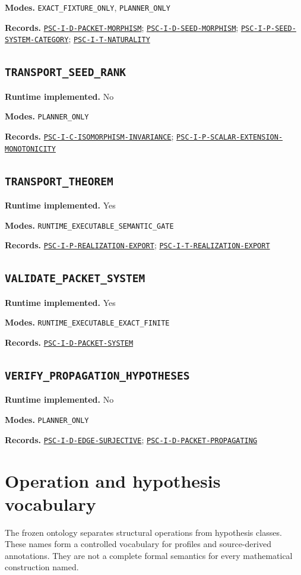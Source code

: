 \documentclass[a4paper,11pt]{article}
\newcommand{\field}[2]{\par\smallskip\noindent\textbf{#1.} #2\par}
\begin{document}
\field{Modes}{\nolinkurl{EXACT_FIXTURE_ONLY}, \nolinkurl{PLANNER_ONLY}}
\field{Records}{\hyperref[rec:PSC-I-D-PACKET-MORPHISM]{\nolinkurl{PSC-I-D-PACKET-MORPHISM}}; \hyperref[rec:PSC-I-D-SEED-MORPHISM]{\nolinkurl{PSC-I-D-SEED-MORPHISM}}; \hyperref[rec:PSC-I-P-SEED-SYSTEM-CATEGORY]{\nolinkurl{PSC-I-P-SEED-SYSTEM-CATEGORY}}; \hyperref[rec:PSC-I-T-NATURALITY]{\nolinkurl{PSC-I-T-NATURALITY}}}
\subsection*{\nolinkurl{TRANSPORT_SEED_RANK}}
\field{Runtime implemented}{No}
\field{Modes}{\nolinkurl{PLANNER_ONLY}}
\field{Records}{\hyperref[rec:PSC-I-C-ISOMORPHISM-INVARIANCE]{\nolinkurl{PSC-I-C-ISOMORPHISM-INVARIANCE}}; \hyperref[rec:PSC-I-P-SCALAR-EXTENSION-MONOTONICITY]{\nolinkurl{PSC-I-P-SCALAR-EXTENSION-MONOTONICITY}}}
\subsection*{\nolinkurl{TRANSPORT_THEOREM}}
\field{Runtime implemented}{Yes}
\field{Modes}{\nolinkurl{RUNTIME_EXECUTABLE_SEMANTIC_GATE}}
\field{Records}{\hyperref[rec:PSC-I-P-REALIZATION-EXPORT]{\nolinkurl{PSC-I-P-REALIZATION-EXPORT}}; \hyperref[rec:PSC-I-T-REALIZATION-EXPORT]{\nolinkurl{PSC-I-T-REALIZATION-EXPORT}}}
\subsection*{\nolinkurl{VALIDATE_PACKET_SYSTEM}}
\field{Runtime implemented}{Yes}
\field{Modes}{\nolinkurl{RUNTIME_EXECUTABLE_EXACT_FINITE}}
\field{Records}{\hyperref[rec:PSC-I-D-PACKET-SYSTEM]{\nolinkurl{PSC-I-D-PACKET-SYSTEM}}}
\subsection*{\nolinkurl{VERIFY_PROPAGATION_HYPOTHESES}}
\field{Runtime implemented}{No}
\field{Modes}{\nolinkurl{PLANNER_ONLY}}
\field{Records}{\hyperref[rec:PSC-I-D-EDGE-SURJECTIVE]{\nolinkurl{PSC-I-D-EDGE-SURJECTIVE}}; \hyperref[rec:PSC-I-D-PACKET-PROPAGATING]{\nolinkurl{PSC-I-D-PACKET-PROPAGATING}}}
\clearpage\section{Operation and hypothesis vocabulary}
The frozen ontology separates structural operations from hypothesis classes. These names form a controlled vocabulary for profiles and source-derived annotations. They are not a complete formal semantics for every mathematical construction named.
\end{document}
